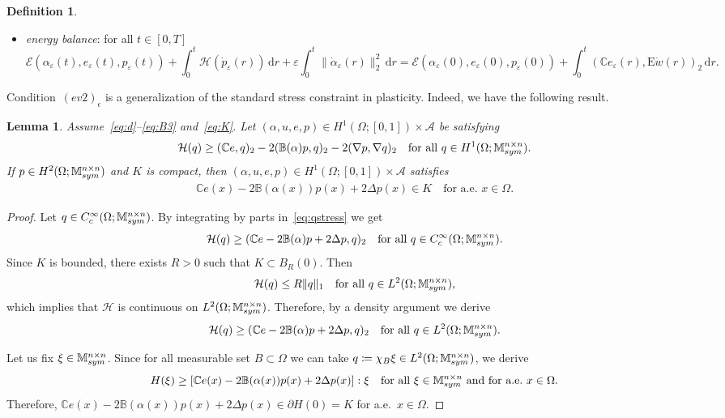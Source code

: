 \documentclass[reqno]{amsart}
\newtheorem{lemma}[corollary]{Lemma}
\theoremstyle{definition}
\newtheorem{definition}[corollary]{Definition}
\numberwithin{equation}{section}
\def\de {\mathrm{d}}
\def\M {\mathbb M^{n\times n}_{\rm sym}}
\def\C {\mathbb C}
\def\B {\mathbb B}
\def\EE {\mathrm{E}}
\begin{document}
\begin{definition}
\begin{itemize}
\item[$(ev4)_\varepsilon$] {\it energy balance}: for all $t\in[0,T]$
\begin{equation*}\mathcal E(\alpha_\varepsilon(t),e_\varepsilon(t),p_\varepsilon(t))+\int_0^t\mathcal H(\dot p_\varepsilon(r)) \,\de r+\varepsilon\int_0^t\|\dot\alpha_\varepsilon(r)\|_2^2 \,\de r=\mathcal E(\alpha_\varepsilon(0),e_\varepsilon(0),p_\varepsilon(0))+\int_0^t(\C e_\varepsilon(r),\EE \dot w(r))_2 \,\de r.\end{equation*}
\end{itemize}
\end{definition}

Condition~$(ev2)_\epsilon$ is a generalization of the standard stress constraint in plasticity. Indeed, we have the following result.

\begin{lemma}
Assume~\eqref{eq:d}--\eqref{eq:B3} and~\eqref{eq:K}. Let $(\alpha,u,e,p)\in H^1(\Omega;[0,1])\times\mathcal A$ be satisfying
\begin{equation}\label{eq:qstress}
\mathcal H(q)\ge (\C e,q)_2-2(\B(\alpha)p,q)_2-2(\nabla p,\nabla q)_2\quad\text{for all $q\in H^1(\Omega;\M)$}.
\end{equation}
If $p\in H^2(\Omega;\M)$ and $K$ is compact, then $(\alpha,u,e,p)\in H^1(\Omega;[0,1])\times\mathcal A$ satisfies
\begin{align*}
\C e(x)-2\B(\alpha(x))p(x)+2 \Delta p(x)\in K\quad\text{for a.e.\ $x\in\Omega$}.
\end{align*}
\end{lemma}
\begin{proof}
Let $q\in C_c^\infty(\Omega;\M)$. By integrating by parts in~\eqref{eq:qstress} we get 
$$\mathcal H(q)\ge (\C e-2\B(\alpha) p+2 \Delta p,q)_2\quad\text{for all $q\in C_c^\infty(\Omega;\M)$}.$$
Since $K$ is bounded, there exists $R>0$ such that $K\subset B_R(0)$. Then 
$$\mathcal H(q)\le R\|q\|_1\quad\text{for all $q\in L^2(\Omega;\M)$},$$
which implies that $\mathcal H$ is continuous on $L^2(\Omega;\M)$. Therefore, by a density argument we derive
$$\mathcal H(q)\ge (\C e-2\B(\alpha) p+2 \Delta p,q)_2\quad\text{for all $q\in L^2(\Omega;\M)$}.$$

Let us fix $\xi\in\M$. Since for all measurable set $B\subset \Omega$ we can take $q\coloneqq \chi_B\xi\in L^2(\Omega;\M)$, we derive
$$H(\xi)\ge [\C e(x)-2\B(\alpha(x)) p(x)+2 \Delta p(x)]:\xi\quad\text{for all $\xi\in \M$ and for a.e.\ $x\in\Omega$}.$$
Therefore, $\C e(x)-2\B(\alpha(x)) p(x)+2 \Delta p(x)\in \partial H(0)=K$ for a.e.\ $x\in\Omega$.
\end{proof}
\end{document}
